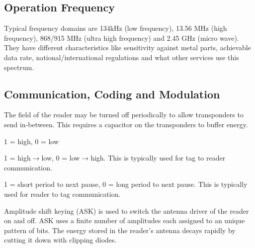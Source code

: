 \subsection{Operation Frequency}
\begin{mytitle} Typical frequency domains are 134kHz (low frequency), 13.56 MHz (high frequency), 868/915 MHz (ultra high frequency) and 2.45 GHz (micro wave). They have different characteristics like sensitivity against metal parts, achievable data rate, national/international regulations and what other services use this spectrum.
\end{mytitle}


\subsection{Communication, Coding and Modulation}
\begin{mytitle} The field of the reader may be turned off periodically to allow transponders to send in-between. This requires a capacitor on the transponders to buffer energy.
\end{mytitle}
\begin{mytitle} 
    \begin{mysubtitle}[NRZ] 1 = high, 0 = low
    \end{mysubtitle}
    \begin{mysubtitle}[Manchester] 1 = high$\to$low, 0 = low$\to$high. This is typically used for tag to reader communication.
    \end{mysubtitle}
    \begin{mysubtitle} 1 = short period to next pause, 0 = long period to next pause. This is typically used for reader to tag communication.
    \end{mysubtitle}
\end{mytitle}
\begin{mytitle} Amplitude shift keying (ASK) is used to switch the antenna driver of the reader on and off. ASK uses a finite number of amplitudes each assigned to an unique pattern of bits. The energy stored in the reader's antenna decays rapidly by cutting it down with clipping diodes. 
\end{mytitle}
